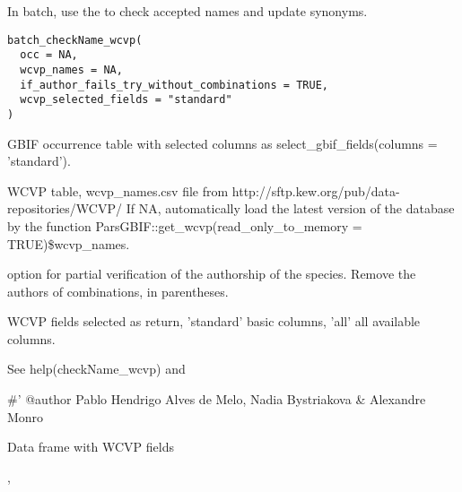 \documentclass[a4paper]{book}
\begin{document}
%
\begin{Description}
In batch, use the 
 to check accepted names and update synonyms.
\end{Description}
%
\begin{Usage}
\begin{verbatim}
batch_checkName_wcvp(
  occ = NA,
  wcvp_names = NA,
  if_author_fails_try_without_combinations = TRUE,
  wcvp_selected_fields = "standard"
)
\end{verbatim}
\end{Usage}
%
\begin{Arguments}
\begin{ldescription}
\item[\code{occ}] GBIF occurrence table with selected columns as select\_gbif\_fields(columns = 'standard').

\item[\code{wcvp\_names}] WCVP table, wcvp\_names.csv file from http://sftp.kew.org/pub/data-repositories/WCVP/ If NA, automatically load the latest version of the database by the function ParsGBIF::get\_wcvp(read\_only\_to\_memory = TRUE)\$wcvp\_names.

\item[\code{if\_author\_fails\_try\_without\_combinations}] option for partial verification of the authorship of the species. Remove the authors of combinations, in parentheses.

\item[\code{wcvp\_selected\_fields}] WCVP fields selected as return, 'standard' basic columns, 'all' all available columns.
\end{ldescription}
\end{Arguments}
%
\begin{Details}
See help(checkName\_wcvp) and 

\#' @author Pablo Hendrigo Alves de Melo,
Nadia Bystriakova \&
Alexandre Monro
\end{Details}
%
\begin{Value}
Data frame with WCVP fields
\end{Value}
%
\begin{SeeAlso}
, 
\end{SeeAlso}
\end{document}
